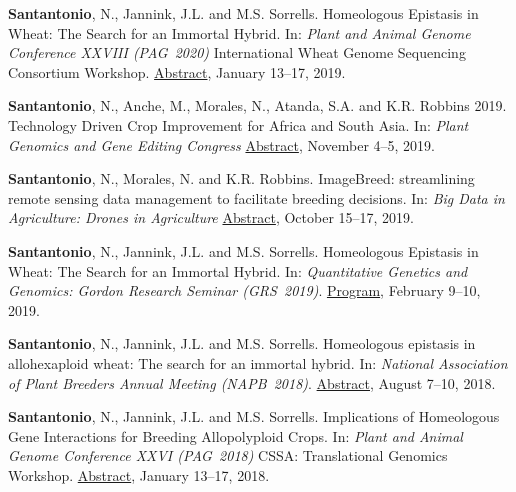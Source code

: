 \documentclass[10pt]{article}
\begin{document}
\begin{bibenum}

\item \textbf{Santantonio}, N., Jannink, J.L. and M.S. Sorrells. Homeologous Epistasis in Wheat: The Search for an Immortal Hybrid. In:  \emph{Plant and Animal Genome Conference  XXVIII (PAG~2020)} International Wheat Genome Sequencing Consortium Workshop. \href{https://www.wheatgenome.org/Meetings-and-Workshops/PAG-2020/Speaker-Profiles/Nicholas-Santantonio} {Abstract}, January 13--17, 2019.

\item \textbf{Santantonio}, N., Anche, M., Morales, N., Atanda, S.A. and K.R. Robbins 2019. Technology Driven Crop Improvement for Africa and South Asia. In: \emph{Plant Genomics and Gene Editing Congress} \href{http://www.global-engage.com/event/plant-genomics-usa/#speakers-slideshow} {Abstract}, November 4--5, 2019.

\item \textbf{Santantonio}, N., Morales, N. and K.R. Robbins. ImageBreed: streamlining remote sensing data management to facilitate breeding decisions. In: \emph{Big Data in Agriculture: Drones in Agriculture} \href{} {Abstract}, October 15--17, 2019.

\item \textbf{Santantonio}, N., Jannink, J.L. and M.S. Sorrells. Homeologous Epistasis in Wheat: The Search for an Immortal Hybrid. In: \emph{Quantitative Genetics and Genomics: Gordon Research Seminar (GRS~2019)}. \href{https://www.grc.org/quantitative-genetics-and-genomics-grs-conference/2019/}{Program}, February 9--10, 2019.

\item \textbf{Santantonio}, N., Jannink, J.L. and M.S. Sorrells. Homeologous epistasis in allohexaploid wheat: The search for an immortal hybrid. In: \emph{National Association of Plant Breeders Annual Meeting (NAPB~2018)}. \href{https://www.plant.uoguelph.ca/napb/abstracts-posters}{Abstract}, August 7--10, 2018.

\item \textbf{Santantonio}, N., Jannink, J.L. and M.S. Sorrells.  Implications of Homeologous Gene Interactions for Breeding Allopolyploid Crops. In: \emph{Plant and Animal Genome Conference  XXVI (PAG~2018)} CSSA: Translational Genomics Workshop. \href{https://pag.confex.com/pag/xxvi/meetingapp.cgi/Paper/28461} {Abstract}, January 13--17, 2018.

\end{bibenum}
\end{document}
